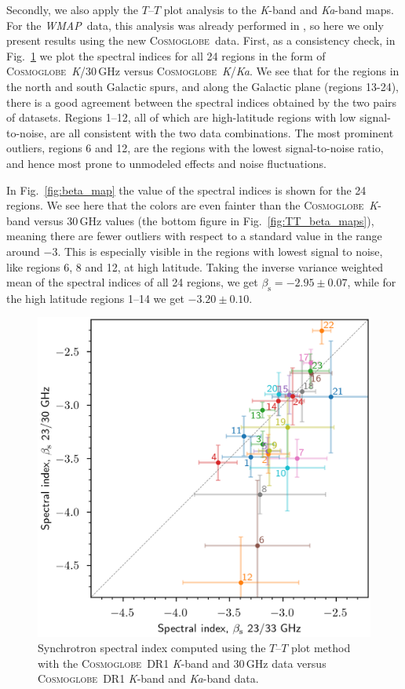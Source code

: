 \documentclass[twocolumn]{../../common/aa}
\def\wmap{\emph{WMAP}}
\newcommand{\cosmoglobe}{\textsc{Cosmoglobe}}
\newcommand{\Cosmoglobe}{\textsc{Cosmoglobe}}
\newcommand{\K}[0]{\textit K}
\newcommand{\Ka}[0]{\textit{Ka}}
\begin{document}
Secondly, we also apply the $T$--$T$ plot analysis to the \K-band and \Ka-band maps. For the \wmap\ data, this analysis was already performed in  \citet{fuskeland2014}, so here we only present results using the new \cosmoglobe\ data. First, as a consistency check, in Fig.~\ref{fig:cos30_xyplot} we plot the spectral indices for all 24 regions in the form of \cosmoglobe\ \K/30\,GHz versus \cosmoglobe\ \K/\Ka. We see that for the regions in the north and south Galactic spurs, and along the Galactic plane (regions 13-24), there is a good agreement between the spectral indices obtained by the two pairs of datasets. Regions 1--12, all of which are high-latitude regions with low signal-to-noise, are all consistent with the two data combinations. The most prominent outliers, regions 6 and 12, are the regions with the lowest signal-to-noise ratio, and hence most prone to unmodeled effects and noise fluctuations.

In Fig.~\ref{fig:beta_map} the value of the spectral indices is shown for the 24 regions. We see here that the colors are even fainter than the \cosmoglobe\ \K-band versus 30\,GHz values (the bottom figure in Fig.~\ref{fig:TT_beta_maps}), meaning there are fewer outliers with respect to a standard value in the range around $-3$. This is especially visible in the regions with lowest signal to noise, like regions 6, 8 and 12, at high latitude. Taking the inverse variance weighted mean of the spectral indices of all 24 regions, we get $\beta_{\mathrm{s}}=-2.95\pm0.07$, while for the high latitude regions 1--14 we get $-3.20\pm0.10$.


\begin{figure}
        \centering
        \includegraphics[width=\linewidth]{figures/xy_regions.png}
        \caption{
Synchrotron spectral index computed using the $T$--$T$ plot method with the \Cosmoglobe\ DR1 \K-band and 30\,GHz data versus \Cosmoglobe\ DR1 \K-band and \Ka-band data.}
        \label{fig:cos30_xyplot}
\end{figure}
\end{document}

